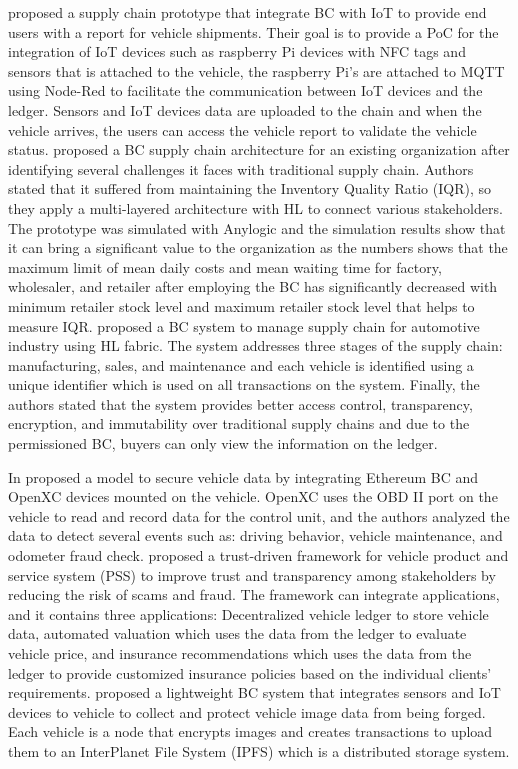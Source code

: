 \cite{Reimers2019-el}
proposed a supply chain prototype that integrate BC with IoT to provide end users with a report for vehicle shipments. Their goal is
to provide a PoC for the integration of IoT devices such as raspberry Pi devices with NFC tags and sensors that is attached to the vehicle,
the raspberry Pi’s are attached to MQTT using Node-Red to facilitate the communication between IoT devices and the ledger. Sensors and IoT
devices data are uploaded to the chain and when the vehicle arrives, the users can access the vehicle report to validate the vehicle status.
\cite{Ada2021-fn} proposed a BC supply chain architecture for an existing organization after identifying several challenges it faces
with traditional supply chain. Authors stated that it suffered from maintaining the Inventory Quality Ratio (IQR), so they apply a
multi-layered architecture with HL to connect various stakeholders. The prototype was simulated with Anylogic and the simulation results
show that it can bring a significant value to the organization as the numbers shows that the maximum limit of mean daily costs and mean
waiting time for factory, wholesaler, and retailer after employing the BC has significantly decreased with minimum retailer stock level and
maximum retailer stock level that helps to measure IQR. \cite{Zafar2022-uk} proposed a BC system to manage supply chain for automotive
industry using HL fabric. The system addresses three stages of the supply chain: manufacturing, sales, and maintenance and each vehicle is
identified using a unique identifier which is used on all transactions on the system. Finally, the authors stated that the system provides
better access control, transparency, encryption, and immutability over traditional supply chains and due to the permissioned BC, buyers can
only view the information on the ledger.

In \cite{Saldamli2020-zk}
proposed a model to secure vehicle data by integrating Ethereum BC and OpenXC devices mounted on the vehicle. OpenXC uses the OBD
II port on the vehicle to read and record data for the control unit, and the authors analyzed the data to detect several events such as:
driving behavior, vehicle maintenance, and odometer fraud check. \cite{Wang2020-tm} proposed a trust-driven framework for vehicle
product and service system (PSS) to improve trust and transparency among stakeholders by reducing the risk of scams and fraud. The framework
can integrate applications, and it contains three applications: Decentralized vehicle ledger to store vehicle data, automated valuation
which uses the data from the ledger to evaluate vehicle price, and insurance recommendations which uses the data from the ledger to provide
customized insurance policies based on the individual clients' requirements. \cite{Na2021-tc} proposed a lightweight BC
system that integrates sensors and IoT devices to vehicle to collect and protect vehicle image data from being forged. Each vehicle is a
node that encrypts images and creates transactions to upload them to an InterPlanet File System (IPFS) which is a distributed storage
system.

